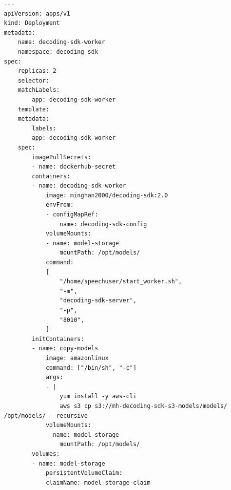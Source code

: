 \begin{lstlisting}[caption={Kubernetes Manifest for deploying SpeechLab ASR Application.}]
---
apiVersion: apps/v1
kind: Deployment
metadata:
    name: decoding-sdk-worker
    namespace: decoding-sdk
spec:
    replicas: 2
    selector:
    matchLabels:
        app: decoding-sdk-worker
    template:
    metadata:
        labels:
        app: decoding-sdk-worker
    spec:
        imagePullSecrets:
        - name: dockerhub-secret
        containers:
        - name: decoding-sdk-worker
            image: minghan2000/decoding-sdk:2.0
            envFrom:
            - configMapRef:
                name: decoding-sdk-config
            volumeMounts:
            - name: model-storage
                mountPath: /opt/models/
            command:
            [
                "/home/speechuser/start_worker.sh",
                "-m",
                "decoding-sdk-server",
                "-p",
                "8010",
            ]
        initContainers:
        - name: copy-models
            image: amazonlinux
            command: ["/bin/sh", "-c"]
            args:
            - |
                yum install -y aws-cli
                aws s3 cp s3://mh-decoding-sdk-s3-models/models/ /opt/models/ --recursive
            volumeMounts:
            - name: model-storage
                mountPath: /opt/models/
        volumes:
        - name: model-storage
            persistentVolumeClaim:
            claimName: model-storage-claim
    
    
\end{lstlisting}
